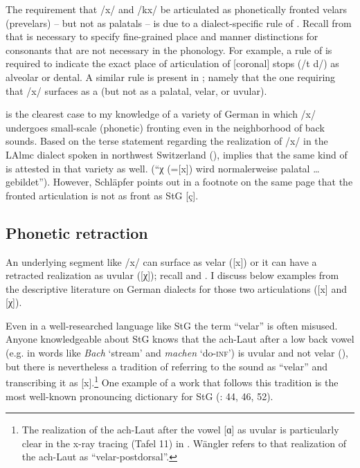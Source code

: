 The requirement that  /x/ and /kx/ be articulated as phonetically front\-ed velars (prevelars) -- but not as palatals -- is due to a dialect-specific rule of . Recall from  that  is necessary to specify fine-grained place and manner distinctions for consonants that are not necessary in the phonology. For example, a rule of  is required to indicate the exact place of articulation of [coronal] stops (/t d/) as alveolar or dental. A similar rule is present in ; namely that the one requiring that /x/ surfaces as a  (but not as a palatal, velar, or uvular).\largerpage

 is the clearest case to my knowledge of a variety of German in which /x/ undergoes small-scale (phonetic) fronting even in the neighborhood of back sounds. Based on the terse statement regarding the realization of /x/ in the LAlmc dialect spoken in northwest Switzerland (), \citet[30]{Schläpfer1956} implies that the same kind of  is attested in that variety as well. (“χ (=[x]) wird normalerweise palatal … gebildet”). However, Schläpfer points out in a footnote on the same page that the fronted articulation is not as front as StG [ç].


\subsection{Phonetic retraction}\label{sec:12.9.2}
An underlying segment like /x/ can surface as velar ([x]) or it can have a retracted realization as uvular ([χ]); recall  and . I discuss below examples from the descriptive literature on German dialects for those two articulations ([x] and [χ]). 

Even in a well-researched language like StG the term “velar” is often misused. Anyone knowledgeable about StG knows that the ach-Laut after a low back vowel (e.g. in words like \textit{Bach} ‘stream’ and \textit{machen} ‘do-\textsc{inf}’) is uvular and not velar (\citealt{Kohler1990b, Kohler1990a}), but there is nevertheless a tradition of referring to the sound as “velar” and transcribing it as [x].\footnote{The realization of the ach-Laut after the vowel [ɑ] as uvular is particularly clear in the x-ray tracing (Tafel 11)  in \citet{Wängler1981}. Wängler refers to that realization of the ach-Laut as “velar-postdorsal”.} One example of a work that follows this tradition is the most well-known pronouncing dictionary for StG (\citealt{Mangold2005}: 44, 46, 52).

